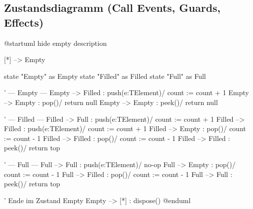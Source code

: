 \documentclass[12pt]{article}
\begin{document}
\subsection*{Zustandsdiagramm (Call Events, Guards, Effects)}
\def\PlantUMLJobname{SWT-states}
\begin{plantuml}
@startuml
hide empty description

[*] --> Empty

state "Empty" as Empty
state "Filled" as Filled
state "Full" as Full

' --- Empty ---
Empty --> Filled : push(e:TElement)\n/ count := count + 1
Empty --> Empty  : pop()\n[count == 0]\n/ return null
Empty --> Empty  : peek()\n[count == 0]\n/ return null

' --- Filled ---
Filled --> Full   : push(e:TElement)\n[count + 1 == capacity]\n/ count := count + 1
Filled --> Filled : push(e:TElement)\n/ count := count + 1
Filled --> Empty  : pop()\n[count - 1 == 0]\n/ count := count - 1
Filled --> Filled : pop()\n[count - 1  > 0]\n/ count := count - 1
Filled --> Filled : peek()\n[count > 0]\n/ return top

' --- Full ---
Full --> Full   : push(e:TElement)\n[count == capacity]\n/ no-op
Full --> Empty  : pop()\n[count - 1 == 0]\n/ count := count - 1
Full --> Filled : pop()\n[count - 1  > 0]\n/ count := count - 1
Full --> Full   : peek()\n[count > 0]\n/ return top

' Ende im Zustand Empty
Empty --> [*] : dispose()
@enduml
\end{plantuml}
\end{document}
